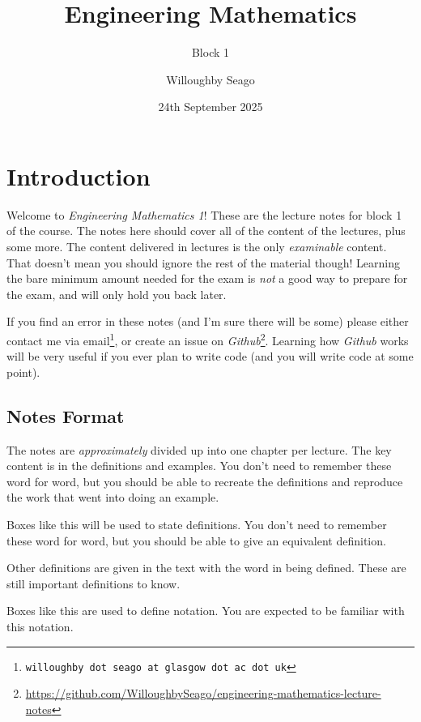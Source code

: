 \documentclass[fleqn]{LectureClass/LectureClass}
\title{Engineering Mathematics}
\author{Willoughby Seago}
\date{24th September 2025}
\subtitle{Block 1}
\begin{document}
    \frontmatter
    \titlepage
    \tableofcontents
    \listoffigures
    \mainmatter
    
    \setcounter{chapter}{-1}
    \chapter{Introduction}
    Welcome to \textit{Engineering Mathematics 1}!
    These are the lecture notes for block 1 of the course.
    The notes here should cover all of the content of the lectures, plus some more.
    The content delivered in lectures is the only \emph{examinable} content.
    That doesn't mean you should ignore the rest of the material though!
    Learning the bare minimum amount needed for the exam is \emph{not} a good way to prepare for the exam, and will only hold you back later.
    
    If you find an error in these notes (and I'm sure there will be some) please either contact me via email\footnote{\texttt{willoughby dot seago at glasgow dot ac dot uk}}, or create an issue on \textit{Github}\footnote{\url{https://github.com/WilloughbySeago/engineering-mathematics-lecture-notes}}.
    Learning how \textit{Github} works will be very useful if you ever plan to write code (and you will write code at some point).
    
    \section{Notes Format}
    The notes are \emph{approximately} divided up into one chapter per lecture.
    The key content is in the definitions and examples.
    You don't need to remember these word for word, but you should be able to recreate the definitions and reproduce the work that went into doing an example.
    
    \begin{dfn}{}{}
        Boxes like this will be used to state definitions.
        You don't need to remember these word for word, but you should be able to give an equivalent definition.
    \end{dfn}
    
    Other definitions are given in the text with the word in  being defined.
    These are still important definitions to know.
    
    \begin{ntn}{}{}
        Boxes like this are used to define notation.
        You are expected to be familiar with this notation.
    \end{ntn}
    
\end{document}
